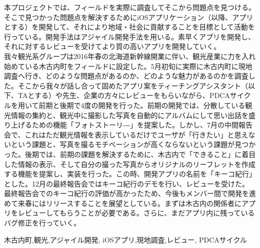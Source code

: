 \begin{jabstract}
\quad 本プロジェクトでは、フィールドを実際に調査してそこから問題点を見つける。そこで見つかった問題点を解決するためにiOSアプリケーション（以降、アプリとする）を開発して、それにより地域・社会に貢献することを目標として活動を行っている。開発手法はアジャイル開発手法を用いる。素早くアプリを開発し、それに対するレビューを受けてより質の高いアプリを開発していく。\\
\quad 我々観光系グループは2016年春の北海道新幹線開業に伴い、観光産業に力を入れ始めている木古内町をフィールドに設定した。5月初旬に実際に木古内町に現地調査へ行き、どのような問題点があるのか、どのような魅力があるのかを調査した。そこから我々が話し合って固めたアプリ案をティーチングアシスタント（以下、TAとする）や先生、企業の方々にレビューをもらいながら、PDCAサイクルを用いて前期と後期で4度の開発を行った。前期の開発では、分散している観光情報の集約と、観光中に撮影した写真を自動的にアルバムにして思い出話を盛り上げるための機能「フォトストーリ―」を提案した。しかし、7月の中間報告会で、これはただ観光情報を表示しているだけでユーザが「行きたい」と思えないという課題と、写真を撮るモチベーションが高くならないという課題が見つかった。後期では、前期の課題を解決するために、木古内で「できること」に着目した情報の表示、そして自分の撮った写真からオリジナルのリーフレットを作成する機能を提案し、実装を行った。この時、開発アプリの名前を「キーコ紀行」とした。12月の最終報告会ではキーコ紀行のデモを行い、レビューを受けた。\\
\quad 最終報告会でのキーコ紀行の評価が高かったため、今後もメンバー間で開発を進めて来春にはリリースすることを展望としている。まずは木古内の関係者にアプリをレビューしてもらうことが必要である。さらに、まだアプリ内に残っているバグ修正を行っていく。\\

\begin{jkeyword}
木古内町,観光,アジャイル開発, iOSアプリ,現地調査,レビュー, PDCAサイクル
\end{jkeyword}
\end{jabstract}

